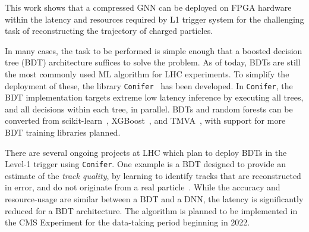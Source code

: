 This work shows that a compressed GNN can be deployed on FPGA hardware within the latency and resources required by L1 trigger system for the challenging task of reconstructing the trajectory of charged particles.

In many cases, the task to be performed is simple enough that a boosted decision tree (BDT) architecture suffices to solve the problem. 
As of today, BDTs are still the most commonly used ML algorithm for LHC experiments. 
To simplify the deployment of these, the library {\tt Conifer}~\cite{Summers:2020xiy} has been developed. In {\tt Conifer}, the BDT implementation targets extreme low latency inference by executing all trees, and all decisions within each tree, in parallel. 
BDTs and random forests can be converted from scikit-learn~\cite{scikit-learn}, XGBoost~\cite{XGBoost}, and TMVA~\cite{TMVA}, with support for more BDT training libraries planned.

There are several ongoing projects at LHC which plan to deploy BDTs in the Level-1 trigger using {\tt Conifer}. One example is a BDT designed to provide an estimate of the {\em track quality}, by learning to identify tracks that are reconstructed in error, and do not originate from a real particle~\cite{bdt_tq}. 
While the accuracy and resource-usage are similar between a BDT and a DNN, the latency is significantly reduced for a BDT architecture. 
The algorithm is planned to be implemented in the CMS Experiment for the data-taking period beginning in 2022.

